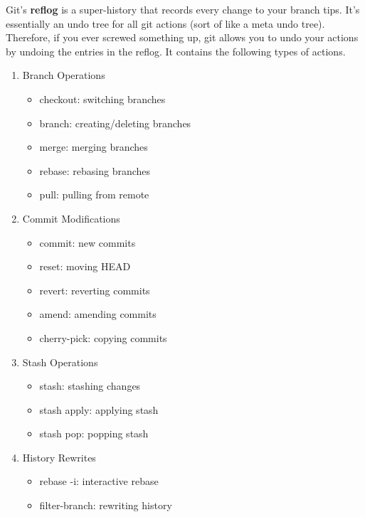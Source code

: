   \begin{definition}[Reflog]
    Git's \textbf{reflog} is a super-history that records every change to your branch tips. It's essentially an undo tree for all git actions (sort of like a meta undo tree). Therefore, if you ever screwed something up, git allows you to undo your actions by undoing the entries in the reflog. It contains the following types of actions. 
    \begin{enumerate}
      \item Branch Operations
        \begin{itemize}
          \item checkout: switching branches
          \item branch: creating/deleting branches
          \item merge: merging branches
          \item rebase: rebasing branches
          \item pull: pulling from remote
        \end{itemize}
      
      \item Commit Modifications
        \begin{itemize}
          \item commit: new commits
          \item reset: moving HEAD
          \item revert: reverting commits
          \item amend: amending commits
          \item cherry-pick: copying commits
        \end{itemize}

      \item Stash Operations
        \begin{itemize}
          \item stash: stashing changes
          \item stash apply: applying stash
          \item stash pop: popping stash
        \end{itemize}

      \item History Rewrites
        \begin{itemize}
          \item rebase -i: interactive rebase
          \item filter-branch: rewriting history
        \end{itemize}


\end{enumerate}
\end{definition}
